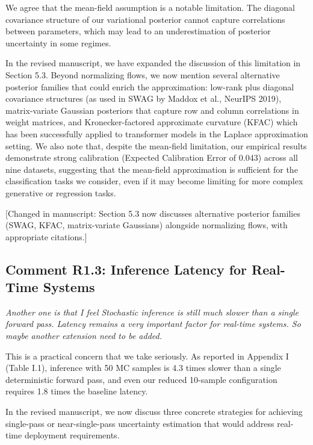 \documentclass[12pt,a4paper]{article}
\newcommand{\reviewertext}[1]{\textcolor{reviewercolor}{\textit{#1}}}
\newcommand{\response}[1]{\textcolor{responsecolor}{#1}}
\newcommand{\changed}[1]{\textcolor{changecolor}{[Changed in manuscript: #1]}}
\begin{document}
\bigskip

\response{We agree that the mean-field assumption is a notable limitation. The diagonal covariance structure of our variational posterior cannot capture correlations between parameters, which may lead to an underestimation of posterior uncertainty in some regimes.}

\response{In the revised manuscript, we have expanded the discussion of this limitation in Section 5.3. Beyond normalizing flows, we now mention several alternative posterior families that could enrich the approximation: low-rank plus diagonal covariance structures (as used in SWAG by Maddox et al., NeurIPS 2019), matrix-variate Gaussian posteriors that capture row and column correlations in weight matrices, and Kronecker-factored approximate curvature (KFAC) which has been successfully applied to transformer models in the Laplace approximation setting. We also note that, despite the mean-field limitation, our empirical results demonstrate strong calibration (Expected Calibration Error of 0.043) across all nine datasets, suggesting that the mean-field approximation is sufficient for the classification tasks we consider, even if it may become limiting for more complex generative or regression tasks.}

\changed{Section 5.3 now discusses alternative posterior families (SWAG, KFAC, matrix-variate Gaussians) alongside normalizing flows, with appropriate citations.}

\bigskip

\subsection*{Comment R1.3: Inference Latency for Real-Time Systems}

\reviewertext{Another one is that I feel Stochastic inference is still much slower than a single forward pass. Latency remains a very important factor for real-time systems. So maybe another extension need to be added.}

\bigskip

\response{This is a practical concern that we take seriously. As reported in Appendix I (Table I.1), inference with 50 MC samples is 4.3 times slower than a single deterministic forward pass, and even our reduced 10-sample configuration requires 1.8 times the baseline latency.}

\response{In the revised manuscript, we now discuss three concrete strategies for achieving single-pass or near-single-pass uncertainty estimation that would address real-time deployment requirements.}
\end{document}
